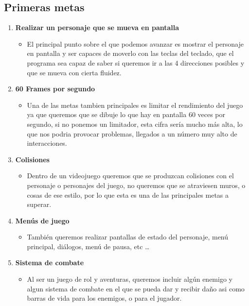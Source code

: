 \documentclass[a4paper]{article}
\begin{document}
\subsection{Primeras metas}
\begin{enumerate}
    \item \textbf{Realizar un personaje que se mueva en pantalla}
          \begin{itemize}
              \item El principal punto sobre el que podemos avanzar es mostrar el personaje en pantalla y ser capaces de moverlo con las teclas del teclado, que el programa sea capaz de saber si queremos ir a las 4 direcciones posibles y que se mueva con cierta fluidez.
          \end{itemize}

    \item \textbf{60 Frames por segundo}
          \begin{itemize}
              \item Una de las metas tambien principales es limitar el rendimiento del juego ya que queremos que se dibuje lo que hay en pantalla 60 veces por segundo, si no ponemos un limitador, esta cifra sería mucho más alta, lo que nos podria provocar problemas, llegados a un número muy alto de interacciones.
          \end{itemize}

    \item \textbf{Colisiones}
          \begin{itemize}
              \item Dentro de un videojuego queremos que se produzcan colisiones con el personaje o personajes del juego, no queremos que se atraviesen muros, o cosas de ese estilo, por lo que esta es una de las principales metas a superar.
          \end{itemize}

    \item \textbf{Menús de juego}
          \begin{itemize}
              \item También queremos realizar pantallas de estado del personaje, menú principal, diálogos, menú de pausa, etc \dots
          \end{itemize}

    \item \textbf{Sistema de combate}
          \begin{itemize}
              \item Al ser un juego de rol y aventuras, queremos incluir algún enemigo y algun sistema de combate en el que se pueda dar y recibir daño asi como barras de vida para los enemigos, o para el jugador.
          \end{itemize}


\end{enumerate}
\end{document}
